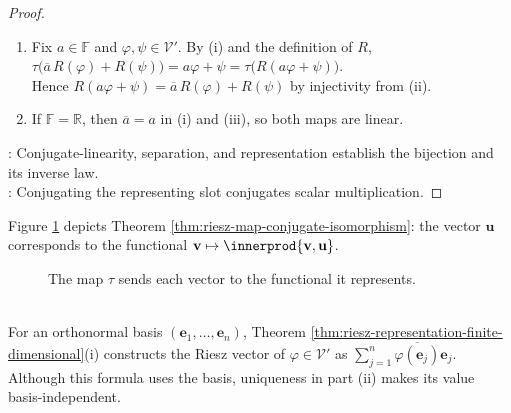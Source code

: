 \begin{theorem}
\begin{proof}
\begin{enumerate}[label=(\roman*)]
\item Fix $a\in\mathbb{F}$ and $\varphi,\psi\in\mathcal{V}'$. By (i) and the definition of $R$, $\tau\bigl(\overline{a}\,R(\varphi)+R(\psi)\bigr)=a\varphi+\psi=\tau\bigl(R(a\varphi+\psi)\bigr)$.\\
Hence $R(a\varphi+\psi)=\overline{a}\,R(\varphi)+R(\psi)$ by injectivity from (ii).
\item If $\mathbb{F}=\mathbb{R}$, then $\overline{a}=a$ in (i) and (iii), so both maps are linear.
\end{enumerate}
: Conjugate-linearity, separation, and representation establish the bijection and its inverse law.\\
: Conjugating the representing slot conjugates scalar multiplication.
\end{proof}
\end{theorem}

Figure \ref{fig:riesz-representation-vector-functional} depicts Theorem \ref{thm:riesz-map-conjugate-isomorphism}: the vector $\mathbf{u}$ corresponds to the functional $\mathbf{v}\mapsto\innerprod{\mathbf{v},\mathbf{u}}$.

\begin{figure}[H]
  \centering
  
  \caption{The map $\tau$ sends each vector to the functional it represents.}
  \label{fig:riesz-representation-vector-functional}
\end{figure}

\begin{perspective} \label{per:riesz-representation-coordinates} \\
For an orthonormal basis $(\mathbf{e}_1,\ldots,\mathbf{e}_n)$, Theorem \ref{thm:riesz-representation-finite-dimensional}(i) constructs the Riesz vector of $\varphi\in\mathcal{V}'$ as $\sum\limits_{j=1}^{n}\overline{\varphi(\mathbf{e}_j)}\mathbf{e}_j$.\\
Although this formula uses the basis, uniqueness in part (ii) makes its value basis-independent.
\end{perspective}

